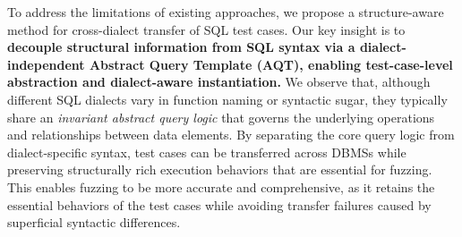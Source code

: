 \documentclass[conference]{IEEEtran}
\begin{document}
To address the limitations of existing approaches, we propose a structure-aware method for cross-dialect transfer of SQL test cases. 
Our key insight is to \textbf{decouple structural information from SQL syntax via a dialect-independent Abstract Query Template (AQT), enabling test-case-level abstraction and dialect-aware instantiation.}
We observe that, although different SQL dialects vary in function naming or syntactic sugar, they typically share an \textit{invariant abstract query logic} that governs the underlying operations and relationships between data elements.
By separating the core query logic from dialect-specific syntax, test cases can be transferred across DBMSs while preserving structurally rich execution behaviors that are essential for fuzzing. 
This enables fuzzing to be more accurate and comprehensive, as it retains the essential behaviors of the test cases while avoiding transfer failures caused by superficial syntactic differences.


\end{document}
